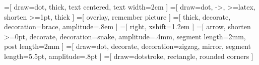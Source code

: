 



=[
    draw=dot,
    thick,
    text centered,
    text width=2cm
]
=[
    draw=dot,
    ->,
    >=latex,
    shorten >=1pt,
    thick
]
=[
    overlay,
    remember picture
]
=[
    thick,
    decorate,
    decoration={brace, amplitude=.8em}
]
=[
    right,
    xshift=1.2em
]
=[
    arrow,
    shorten >=0pt,
    decorate,
    decoration={snake, amplitude=.4mm, segment length=2mm, post length=2mm}
]
=[
    draw=dot,
    decorate,
    decoration={zigzag, mirror, segment length=5.5pt, amplitude=.8pt}
]
=[
    draw=dotstroke,
    rectangle,
    rounded corners
]

\newcommand{\ingray}[1]{\textcolor{light-gray}{#1}}

